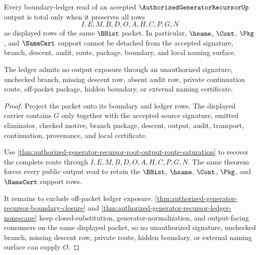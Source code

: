 \begin{theorem}
\label{thm:authorized-generator-recursor-boundary-ledger-totality}
Every boundary-ledger read of an accepted $\AuthorizedGeneratorRecursorUp$ output is total only when it preserves all rows
$$
I,E,M,B,D,O,A,H,C,P,G,N
$$
as displayed rows of the same $\BHist$ packet. In particular, $\hsame$, $\Cont$, $\Pkg$, and $\NameCert$ support cannot be detached from the accepted signature, branch, descent, audit, route, package, boundary, and local naming surface.

The ledger admits no output exposure through an unauthorized signature, unchecked branch, missing descent row, absent audit row, private continuation route, off-packet package, hidden boundary, or external naming certificate.
\end{theorem}
\begin{proof}
Project the packet onto its boundary and ledger rows. The displayed carrier contains $G$ only together with the accepted source signature, emitted eliminator, checked motive, branch package, descent, output, audit, transport, continuation, provenance, and local certificate.

Use \autoref{thm:authorized-generator-recursor-root-output-route-saturation} to recover the complete route through $I,E,M,B,D,O,A,H,C,P,G,N$. The same theorem forces every public output read to retain the $\BHist$, $\hsame$, $\Cont$, $\Pkg$, and $\NameCert$ support rows.

It remains to exclude off-packet ledger exposure. \autoref{thm:authorized-generator-recursor-boundary-closure} and \autoref{thm:authorized-generator-recursor-ledger-nonescape} keep closed-substitution, generator-normalization, and output-facing consumers on the same displayed packet, so no unauthorized signature, unchecked branch, missing descent row, private route, hidden boundary, or external naming surface can supply $O$.
\end{proof}

